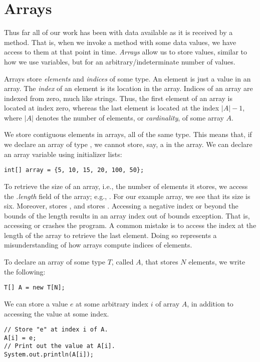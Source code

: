 \section{Arrays}

Thus far all of our work has been with data available as it is received by a method. That is, when we invoke a method with some data values, we have access to them at that point in time. \textit{Arrays} allow us to store values, similar to how we use variables, but for an arbitrary/indeterminate number of values.

Arrays store \textit{elements} and \textit{indices} of some type. An element is just a value in an array. The \textit{index} of an element is its location in the array. Indices of an array are indexed from zero, much like strings. Thus, the first element of an array is located at index zero, whereas the last element is located at the index $|A| - 1$, where $|A|$ denotes the number of elements, or \textit{cardinality}, of some array $A$.

We store contiguous elements in arrays, all of the same type. This means that, if we declare an array of type , we cannot store, say, a  in the array. We can declare an array variable using initializer lists:
\begin{verbatim}
int[] array = {5, 10, 15, 20, 100, 50};
\end{verbatim}
To retrieve the size of an array, i.e., the number of elements it stores, we access the \textit{.length} field of the array; e.g., . For our example array, we see that its size is six. Moreover,  stores , and  stores . Accessing a negative index or beyond the bounds of the length results in an array index out of bounds exception. That is, accessing  or  crashes the program. A common mistake is to access the index at the length of the array to retrieve the last element. Doing so represents a misunderstanding of how arrays compute indices of elements.

To declare an array of some type $T$, called $A$, that stores $N$ elements, we write the following:
\begin{verbatim}
T[] A = new T[N];
\end{verbatim}
We can store a value $e$ at some arbitrary index $i$ of array $A$, in addition to accessing the value at some index.
\begin{verbatim}
// Store "e" at index i of A.
A[i] = e;
// Print out the value at A[i].
System.out.println(A[i]);
\end{verbatim}

